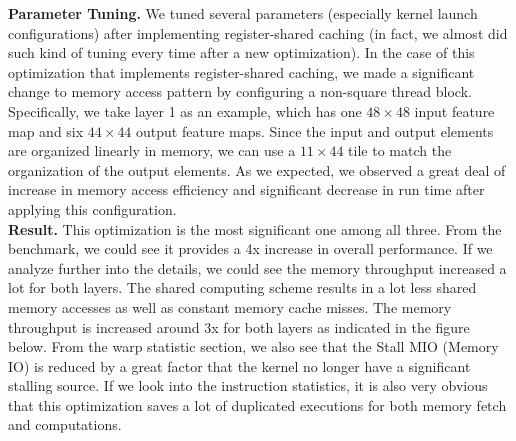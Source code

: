 \documentclass{article}
\begin{document}
\textbf{Parameter Tuning.} We tuned several parameters (especially kernel launch
configurations) after implementing register-shared caching (in fact, we almost
did such kind of tuning every time after a new optimization). In the case of
this optimization that implements register-shared caching, we made a significant
change to memory access pattern by configuring a non-square thread block.
Specifically, we take layer 1 as an example, which has one $48\times48$ input feature map and six $44\times44$ output feature maps. Since the input and output
elements are organized linearly in memory, we can use a $11\times44$ tile to match
the organization of the output elements. As we expected, we observed a great deal
of increase in memory access efficiency and significant decrease in run time after
applying this configuration. \\

\textbf{Result.} This optimization is the most significant one among all three.
From the benchmark, we could see it provides a 4x increase in overall performance.
If we analyze further into the details, we could see the memory throughput
increased a lot for both layers. The shared computing scheme results in a lot less
shared memory accesses as well as constant memory cache misses. The memory throughput
is increased around 3x for both layers as indicated in the figure below. From the
warp statistic section, we also see that the Stall MIO (Memory IO) is reduced by
a great factor that the kernel no longer have a significant stalling source. If
we look into the instruction statistics, it is also very obvious that this optimization
saves a lot of duplicated executions for both memory fetch and computations.
\end{document}
